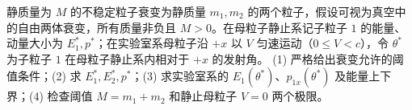 静质量为 \(M\) 的不稳定粒子衰变为静质量 \(m_1,m_2\) 的两个粒子，假设可视为真空中的自由两体衰变，所有质量非负且 \(M>0\)。在母粒子静止系记子粒子 \(1\) 的能量、动量大小为 \(E_1^*,p^*\)；在实验室系母粒子沿 \(+x\) 以 \(V\) 匀速运动（\(0\le V<c\)），令 \(\theta^*\) 为子粒子 \(1\) 在母粒子静止系内相对于 \(+x\) 的发射角。
(1) 严格给出衰变允许的阈值条件；(2) 求 \(E_1^*,E_2^*,p^*\)；(3) 求实验室系的 \(E_1(\theta^*)\)、\(p_{1x}(\theta^*)\) 及能量上下界；(4) 检查阈值 \(M=m_1+m_2\) 和静止母粒子 \(V=0\) 两个极限。
